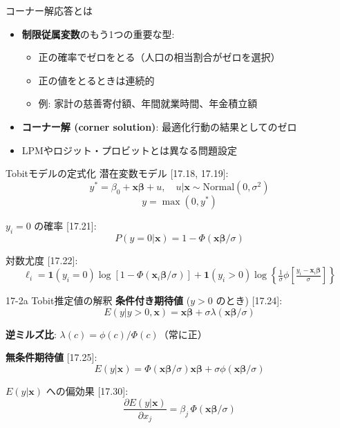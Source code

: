 \documentclass[
  ignorenonframetext,
]{beamer}
\providecommand{\tightlist}{%
  \setlength{\itemsep}{0pt}\setlength{\parskip}{0pt}}
\begin{document}
\begin{frame}{コーナー解応答とは}
\protect\hypertarget{ux30b3ux30fcux30caux30fcux89e3ux5fdcux7b54ux3068ux306f}{}
\begin{itemize}
\tightlist
\item
  \textbf{制限従属変数}のもう1つの重要な型:

  \begin{itemize}
  \tightlist
  \item
    正の確率でゼロをとる（人口の相当割合がゼロを選択）
  \item
    正の値をとるときは連続的
  \item
    例: 家計の慈善寄付額、年間就業時間、年金積立額
  \end{itemize}
\item
  \textbf{コーナー解 (corner solution)}: 最適化行動の結果としてのゼロ
\item
  LPMやロジット・プロビットとは異なる問題設定
\end{itemize}
\end{frame}

\begin{frame}{Tobitモデルの定式化}
\protect\hypertarget{tobitux30e2ux30c7ux30ebux306eux5b9aux5f0fux5316}{}
潜在変数モデル {[}17.18, 17.19{]}:
\[y^* = \beta_0 + \mathbf{x\beta} + u, \quad u|\mathbf{x} \sim \text{Normal}(0, \sigma^2)\]
\[y = \max(0, y^*)\]

\(y_i = 0\) の確率 {[}17.21{]}:
\[P(y = 0|\mathbf{x}) = 1 - \Phi(\mathbf{x\beta}/\sigma)\]

対数尤度 {[}17.22{]}:
\[\ell_i = \mathbf{1}(y_i=0)\log[1-\Phi(\mathbf{x}_i\boldsymbol{\beta}/\sigma)]
         + \mathbf{1}(y_i>0)\log\!\left\{\tfrac{1}{\sigma}\phi\!\left[\tfrac{y_i - \mathbf{x}_i\boldsymbol{\beta}}{\sigma}\right]\right\}\]
\end{frame}

\begin{frame}{17-2a Tobit推定値の解釈}
\protect\hypertarget{a-tobitux63a8ux5b9aux5024ux306eux89e3ux91c8}{}
\textbf{条件付き期待値} (\(y > 0\) のとき) {[}17.24{]}:
\[E(y|y>0, \mathbf{x}) = \mathbf{x\beta} + \sigma\lambda(\mathbf{x\beta}/\sigma)\]

\textbf{逆ミルズ比}: \(\lambda(c) = \phi(c)/\Phi(c)\)（常に正）

\textbf{無条件期待値} {[}17.25{]}:
\[E(y|\mathbf{x}) = \Phi(\mathbf{x\beta}/\sigma)\mathbf{x\beta} + \sigma\phi(\mathbf{x\beta}/\sigma)\]

\(E(y|\mathbf{x})\) への偏効果 {[}17.30{]}:
\[\frac{\partial E(y|\mathbf{x})}{\partial x_j} = \beta_j\,\Phi(\mathbf{x\beta}/\sigma)\]
\end{frame}
\end{document}

